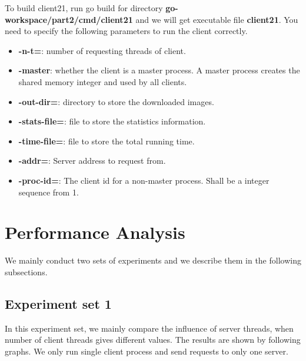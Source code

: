 \documentclass{article}
\begin{document}
\begin{spacing}{1.1}
To build client21, run go build for directory \textbf{go-workspace/part2/cmd/client21} and we will get executable file \textbf{client21}. You need to specify the following parameters to run the client correctly.
\begin{itemize}
    \setlength\itemsep{1pt}
    \item \textbf{-n-t=}: number of requesting threads of client.
    \item \textbf{-master}: whether the client is a master process. A master process creates the shared memory integer and used by all clients.
    \item \textbf{-out-dir=}: directory to store the downloaded images.
    \item \textbf{-stats-file=}: file to store the statistics information.
    \item \textbf{-time-file=}: file to store the total running time.
    \item \textbf{-addr=}: Server address to request from.
    \item \textbf{-proc-id=}: The client id for a non-master process. Shall be a integer sequence from 1.
\end{itemize}

\section{Performance Analysis}
We mainly conduct two sets of experiments and we describe them in the following subsections.

\subsection{Experiment set 1}

In this experiment set, we mainly compare the influence of server threads, when number of client threads gives different values. The results are shown by following graphs. We only run single client process and send requests to only one server.


\end{spacing}
\end{document}
